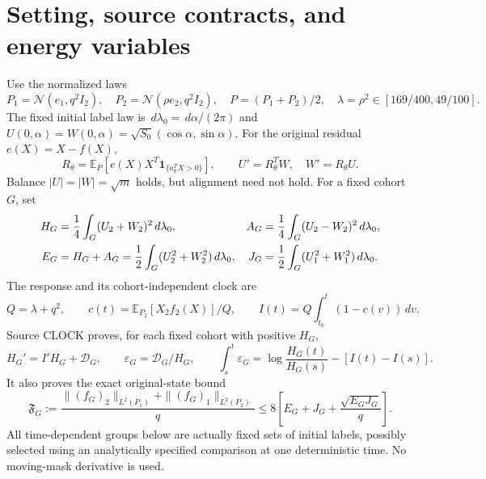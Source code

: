 \documentclass[11pt]{article}
\theoremstyle{remark}\newtheorem{remark}[theorem]{Remark}
\newcommand{\E}{\mathbb E}\newcommand{\dd}{\,d}
\begin{document}
\section{Setting, source contracts, and energy variables}
Use the normalized laws
\[
 P_1=\mathcal N(e_1,q^2I_2),\quad P_2=\mathcal N(\rho e_2,q^2I_2),\quad
 P=(P_1+P_2)/2,\quad \lambda=\rho^2\in[169/400,49/100].
\]
The fixed initial label law is $\dd\lambda_0=\dd\alpha/(2\pi)$ and
$U(0,\alpha)=W(0,\alpha)=\sqrt{S_0}(\cos\alpha,\sin\alpha)$.
For the original residual $e(X)=X-f(X)$,
\[
 R_\theta=\E_P[e(X)X^T\mathbf1_{\{a_\theta^TX>0\}}],\qquad
 U'=R_\theta^TW,\quad W'=R_\theta U.
\]
Balance $|U|=|W|=\sqrt m$ holds, but alignment need not hold. For a fixed cohort $G$, set
\begin{align}
 H_G&=\frac14\int_G(U_2+W_2)^2\dd\lambda_0,&
 A_G&=\frac14\int_G(U_2-W_2)^2\dd\lambda_0,\notag\\
 E_G&=H_G+A_G=\frac12\int_G(U_2^2+W_2^2)\dd\lambda_0,&
 J_G&=\frac12\int_G(U_1^2+W_1^2)\dd\lambda_0.
 \label{inc:AN03:bulkclock:v1:energies}
\end{align}
The response and its cohort-independent clock are
\[
 Q=\lambda+q^2,\qquad c(t)=\E_{P_2}[X_2f_2(X)]/Q,\qquad
 I(t)=Q\int_{t_0}^t(1-c(v))\dd v.
\]
Source CLOCK proves, for each fixed cohort with positive $H_G$,
\begin{equation}\label{inc:AN03:bulkclock:v1:clock}
 H_G'=I'H_G+\mathcal D_G,\qquad
 \varepsilon_G=\mathcal D_G/H_G,\qquad
 \int_s^t\varepsilon_G=\log\frac{H_G(t)}{H_G(s)}-[I(t)-I(s)].
\end{equation}
It also proves the exact original-state bound
\begin{equation}\label{inc:AN03:bulkclock:v1:cross}
 \mathfrak F_G:=\frac{\|(f_G)_2\|_{L^2(P_1)}+\|(f_G)_1\|_{L^2(P_2)}}q
 \le8\left[E_G+J_G+\frac{\sqrt{E_GJ_G}}q\right].
\end{equation}
All time-dependent groups below are actually fixed sets of initial labels, possibly selected using an analytically specified comparison at one deterministic time. No moving-mask derivative is used.
\end{document}
